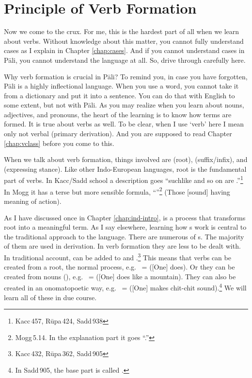 \chapter{Principle of Verb Formation}\label{chap:vform}

Now we come to the crux. For me, this is the hardest part of all when we learn about verbs. Without knowledge about this matter, you cannot fully understand cases as I explain in Chapter \ref{chap:cases}. And if you cannot understand cases in P\=ali, you cannot understand the language at all. So, drive through carefully here.

Why verb formation is crucial in P\=ali? To remind you, in case you have forgotten, P\=ali is a highly inflectional language. When you use a word, you cannot take it from a dictionary and put it into a sentence. You can do that with English to some extent, but not with P\=ali. As you may realize when you learn about nouns, adjectives, and pronouns, the heart of the learning is to know how terms are formed. It is true about verbs as well. To be clear, when I use `verb' here I mean only  not verbal  (primary derivation). And you are supposed to read Chapter \ref{chap:vclass} before you come to this.

When we talk about verb formation, things involved are  (root),  (suffix/infix), and  (expressing stance). Like other Indo-European languages, root is the fundamental part of verbs. In Kacc/Sadd school a description goes ``suchlike  and so on are .''\footnote{Kacc\,457, R\=upa\,424, Sadd\,938} In Mogg it has a terse but more sensible formula, ``''\footnote{Mogg\,5.14. In the explanation part it goes ``.''} (Those [sound] having meaning of action). 

As I have discussed once in Chapter \ref{chap:ind-intro},  is a process that transforms root into a meaningful term. As I say elsewhere, learning how s work is central to the traditional approach to the language. There are numerous of s. The majority of them are used in derivation. In verb formation they are less to be dealt with. In traditional account,  can be added to  and .\footnote{Kacc\,432, R\=upa\,362, Sadd\,905} This means that verbs can be created from a root, the normal process, e.g.\  =  ([One] does). Or they can be created from nouns (), e.g.\  =  ([One] does like a mountain). They can also be created in an onomatopoetic way, e.g.\  =  ([One] makes chit-chit sound).\footnote{In Sadd\,905, the base part is called .} We will learn all of these in due course.

